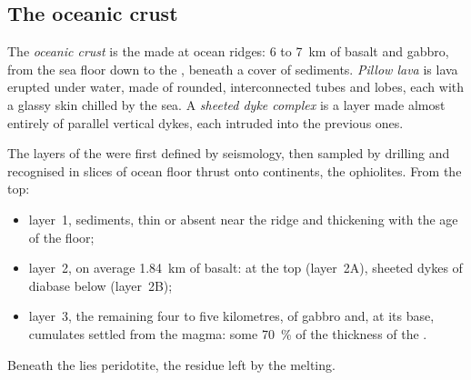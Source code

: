 \subsection*{The oceanic crust}

\begin{definition}\label{def:b1:rifts-ridges-margins:oceanic-crust}
The \emph{oceanic crust} is the  made at ocean
ridges: 6 to \qty{7}{km} of basalt and gabbro, from the sea floor down to the
, beneath a cover of sediments. \emph{Pillow lava} is
lava erupted under water, made of rounded, interconnected tubes and lobes, each
with a glassy skin chilled by the sea. A \emph{sheeted dyke
complex} is a layer made almost entirely of
parallel vertical dykes, each intruded into the previous ones.
\end{definition}

The layers of the  were first defined by seismology, then sampled
by drilling and recognised in slices of ocean floor thrust onto continents,
the ophiolites. From the top:
\begin{itemize}
  \item layer~1, sediments, thin or absent near the ridge and thickening with
        the age of the floor;
  \item layer~2, on average \qty{1.84}{km} of basalt:  at the top
        (layer~2A), sheeted dykes of diabase below (layer~2B);
  \item layer~3, the remaining four to five kilometres, of gabbro and, at its
        base, cumulates settled from the magma: some \qty{70}{\percent} of
        the thickness of the .
\end{itemize}
Beneath the  lies  peridotite, the residue left by the melting.

